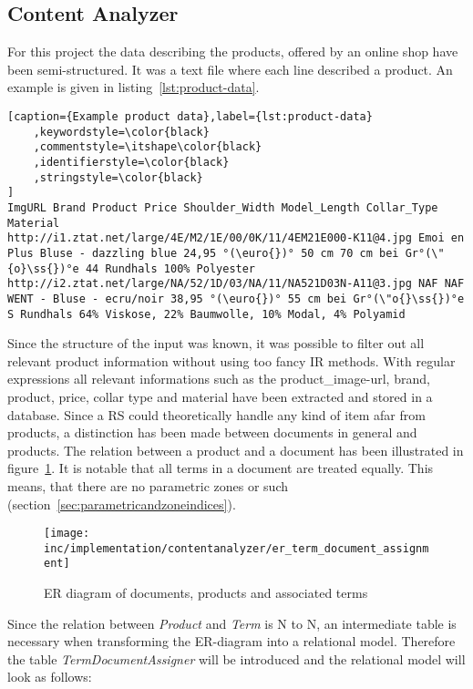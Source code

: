
\subsection{Content Analyzer}
\label{sec:content-analyzer}
For this project the data describing the products, offered by an online shop have been semi-structured.
It was a text file where each line described a product.
An example is given in listing~\ref{lst:product-data}.

\begin{lstlisting}[caption={Example product data},label={lst:product-data}
    ,keywordstyle=\color{black}
    ,commentstyle=\itshape\color{black}
    ,identifierstyle=\color{black}
    ,stringstyle=\color{black}
]
ImgURL Brand Product Price Shoulder_Width Model_Length Collar_Type Material
http://i1.ztat.net/large/4E/M2/1E/00/0K/11/4EM21E000-K11@4.jpg Emoi en Plus Bluse - dazzling blue 24,95 °(\euro{})° 50 cm 70 cm bei Gr°(\"{o}\ss{})°e 44 Rundhals 100% Polyester
http://i2.ztat.net/large/NA/52/1D/03/NA/11/NA521D03N-A11@3.jpg NAF NAF WENT - Bluse - ecru/noir 38,95 °(\euro{})° 55 cm bei Gr°(\"o{}\ss{})°e S Rundhals 64% Viskose, 22% Baumwolle, 10% Modal, 4% Polyamid
\end{lstlisting}

\noindent
Since the structure of the input was known, it was possible to filter out all relevant product information without using too fancy IR methods.
With regular expressions all relevant informations such as the product\_image-url, brand, product, price, collar type and material have been extracted and stored in a database.
Since a RS could theoretically handle any kind of item afar from products, a distinction has been made between documents in general and products.
The relation between a product and a document has been illustrated in figure~\ref{fig:ertermdocumentassignment}.
It is notable that all terms in a document are treated equally.
This means, that there are no parametric zones or such (section~\ref{sec:parametricandzoneindices}).
\begin{figure}[h]
    \center
    \texttt{[image: inc/implementation/contentanalyzer/er\_term\_document\_assignment]}
    \caption{ER diagram of documents, products and associated terms}
    \label{fig:ertermdocumentassignment}
\end{figure}
Since the relation between \textit{Product} and \textit{Term} is N to N, an intermediate table is necessary when transforming the ER-diagram into a relational model.
Therefore the table \textit{TermDocumentAssigner} will be introduced and the relational model will look as follows:

